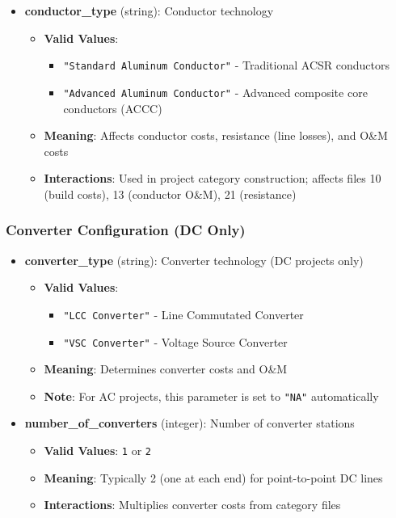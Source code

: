 \documentclass[ctcc_full_documentation.tex]{subfiles}
\begin{document}
\begin{itemize}
    \item \textbf{conductor\_type} (string): Conductor technology
    \begin{itemize}
        \item \textbf{Valid Values}: 
        \begin{itemize}
            \item \texttt{"Standard Aluminum Conductor"} - Traditional ACSR conductors
            \item \texttt{"Advanced Aluminum Conductor"} - Advanced composite core conductors (ACCC)
        \end{itemize}
        \item \textbf{Meaning}: Affects conductor costs, resistance (line losses), and O\&M costs
        \item \textbf{Interactions}: Used in project category construction; affects files 10 (build costs), 13 (conductor O\&M), 21 (resistance)
    \end{itemize}
\end{itemize}

\subsubsection{Converter Configuration (DC Only)}

\begin{itemize}
    \item \textbf{converter\_type} (string): Converter technology (DC projects only)
    \begin{itemize}
        \item \textbf{Valid Values}: 
        \begin{itemize}
            \item \texttt{"LCC Converter"} - Line Commutated Converter
            \item \texttt{"VSC Converter"} - Voltage Source Converter
        \end{itemize}
        \item \textbf{Meaning}: Determines converter costs and O\&M
        \item \textbf{Note}: For AC projects, this parameter is set to \texttt{"NA"} automatically
    \end{itemize}
    
    \item \textbf{number\_of\_converters} (integer): Number of converter stations
    \begin{itemize}
        \item \textbf{Valid Values}: \texttt{1} or \texttt{2}
        \item \textbf{Meaning}: Typically 2 (one at each end) for point-to-point DC lines
        \item \textbf{Interactions}: Multiplies converter costs from category files
    \end{itemize}
\end{itemize}
\end{document}
